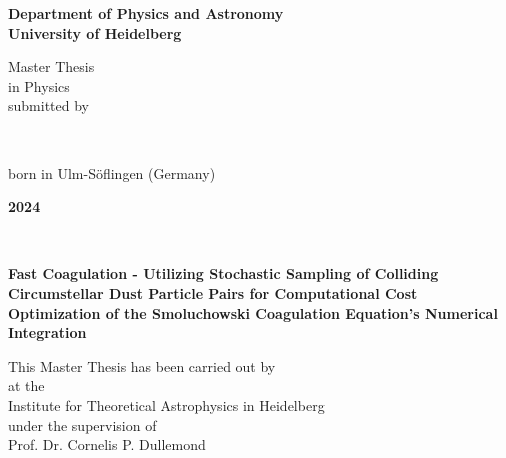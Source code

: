 
\begin{titlepage}
    \begin{center}
        \begin{Large}
            \textbf{
              Department of Physics and Astronomy \\
              University of Heidelberg
            }
        \end{Large}

        \vfill
        
        Master Thesis \\
        in Physics \\
        submitted by \\
        \vspace{0.5cm}

        \begin{Large}
            \textbf{\theauthor} \\
        \end{Large}
        \vspace{0.5cm}

        born in Ulm-Söflingen (Germany) \\
        \vspace{0.5cm}

        \begin{Large}
            \textbf{2024}
        \end{Large}
    \end{center}
\end{titlepage}

\begin{titlepage}
    \ 
\end{titlepage}

\begin{titlepage}
    \begin{center}
        \begin{Large}
            \textbf{
                Fast Coagulation - Utilizing Stochastic Sampling of Colliding Circumstellar Dust 
                Particle Pairs for Computational Cost Optimization of the Smoluchowski Coagulation 
                Equation's Numerical Integration
            }
        \end{Large}
        
        \vfill
        
        This Master Thesis has been carried out by \theauthor \\
        at the \\
        Institute for Theoretical Astrophysics in Heidelberg \\
        under the supervision of \\
        Prof. Dr. Cornelis P. Dullemond
    \end{center}
\end{titlepage}

